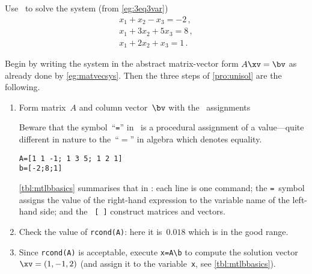 \begin{example} \label{eg:3eq3varc}
Use \script\ to solve the system (from \autoref{eg:3eq3var})
\begin{equation*}
\begin{array}{l}
x_1+x_2-x_3=-2\,,\\
x_1+3x_2+5x_3=8\,,\\
x_1+2x_2+x_3=1\,.
\end{array}
\end{equation*}
\begin{solution} 
Begin by writing the system in the abstract matrix-vector form \(A\xv=\bv\) as already done by \autoref{eg:matvecsys}.
Then the three steps of \autoref{pro:unisol} are the following.
\begin{enumerate}
\item Form matrix~\(A\) and {column vector}~\(\bv\) with the \script\ assignments
\begin{aside}
Beware that the symbol~``\texttt{=}'' in \script\ is a procedural assignment of a value---quite different in nature to the~``\(=\)'' in algebra which denotes equality.
\end{aside}%
\begin{verbatim}
A=[1 1 -1; 1 3 5; 1 2 1]
b=[-2;8;1]
\end{verbatim}
\autoref{tbl:mtlbbasics} summarises that in \script: each line is one command; the \verb|=|~symbol assigns the value of the right-hand expression to the variable name of the left-hand side; and the ~\verb|[ ]| construct matrices and vectors.
\item Check the value of \verb|rcond(A)|: here it is~\(0.018\) which is in the good range.
\item Since \verb|rcond(A)| is acceptable,  execute \verb|x=A\b| to compute the solution vector~\(\xv=(1,-1,2)\) (and assign it to the variable~\verb|x|, see \autoref{tbl:mtlbbasics}). 

\end{enumerate}
\end{solution}
\end{example}
